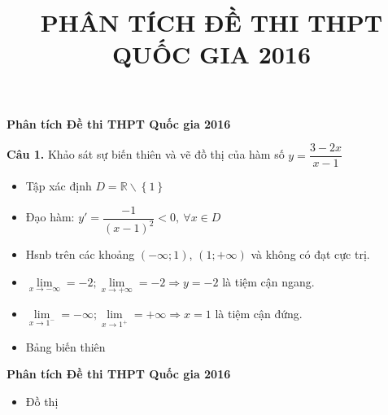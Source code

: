 \documentclass[handout]{beamer} %
\title[Ôn thi THPT Quốc Gia 2016]{\LARGE \textbf{PHÂN TÍCH ĐỀ THI THPT\\ QUỐC GIA 2016}}
\author[Tăng Lâm Tường Vinh (Môn Toán)]{} %
\date{}
\newcommand{\cau}[2]{\begin{block}{}
		{\color{red}\textbf{Câu #1.}} #2
	\end{block}
}
\begin{document}
\begin{frame}
\titlepage %
\end{frame}
\begin{frame}{\textbf{\qquad Phân tích Đề thi THPT Quốc gia 2016}}~\\[-15pt]
	\cau{1}{Khảo sát sự biến thiên và vẽ đồ thị của hàm số $y=\dfrac{3-2x}{x-1}$}
	\begin{itemize}
		\item Tập xác định $D=\mathbb{R} \backslash \left\{ 1 \right\}$
		\item Đạo hàm: $y'=\dfrac{-1}{(x-1)^2}<0,~\forall x\in D$
		\item Hsnb trên các khoảng $(-\infty;1)$, $(1;+\infty)$ và không có đạt cực trị.		
		\item $\lim\limits_{x\rightarrow -\infty} =-2;  \lim\limits_{x\rightarrow +\infty} =-2\Rightarrow y=-2$ là tiệm cận ngang.
		\item $\lim\limits_{x\rightarrow 1^-} =-\infty; \lim\limits_{x\rightarrow 1^+} =+\infty\Rightarrow x=1$ là tiệm cận đứng.		
		\item Bảng biến thiên
		\begin{center}
			
		\end{center}
	\end{itemize}
\end{frame}

\begin{frame}{\textbf{\qquad Phân tích Đề thi THPT Quốc gia 2016}}~\\[-20pt]
	\begin{itemize}
		\item Đồ thị
		\begin{center}
			
		\end{center}
	\end{itemize}
\end{frame}
\end{document}
